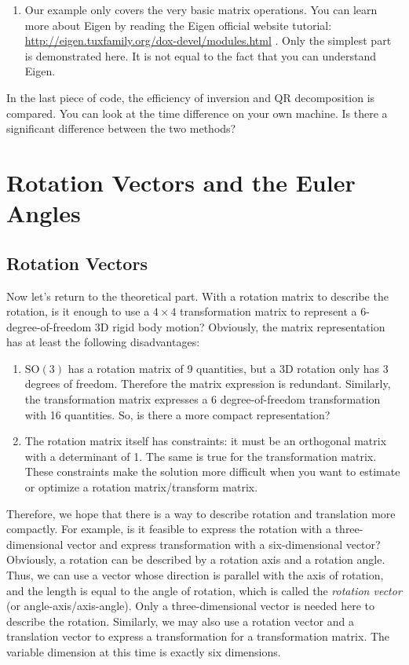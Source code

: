 \begin{enumerate}
    \item Our example only covers the very basic matrix operations. You can learn more about Eigen by reading the Eigen official website tutorial: \\ { \url{http://eigen.tuxfamily.org/dox-devel/modules.html} }. Only the simplest part is demonstrated here. It is not equal to the fact that you can understand Eigen.
\end{enumerate}

In the last piece of code, the efficiency of inversion and QR decomposition is compared. You can look at the time difference on your own machine. Is there a significant difference between the two methods?

\section{Rotation Vectors and the Euler Angles}
\subsection{Rotation Vectors}
Now let's return to the theoretical part. With a rotation matrix to describe the rotation, is it enough to use a $4 \times 4$ transformation matrix to represent a 6-degree-of-freedom 3D rigid body motion? Obviously, the matrix representation has at least the following disadvantages:
\begin{enumerate}
    \item  $\mathrm{SO}( 3 ) $ has a rotation matrix of 9 quantities, but a 3D rotation only has 3 degrees of freedom. Therefore the matrix expression is redundant. Similarly, the transformation matrix expresses a 6 degree-of-freedom transformation with 16 quantities. So, is there a more compact representation?
    \item The rotation matrix itself has constraints: it must be an orthogonal matrix with a determinant of 1. The same is true for the transformation matrix. These constraints make the solution more difficult when you want to estimate or optimize a rotation matrix/transform matrix.
\end{enumerate}

Therefore, we hope that there is a way to describe rotation and translation more compactly. For example, is it feasible to express the rotation with a three-dimensional vector and express transformation with a six-dimensional vector? Obviously, a rotation can be described by a rotation axis and a rotation angle. Thus, we can use a vector whose direction is parallel with the axis of rotation, and the length is equal to the angle of rotation, which is called the \textit{rotation vector} (or angle-axis/axis-angle). Only a three-dimensional vector is needed here to describe the rotation. Similarly, we may also use a rotation vector and a translation vector to express a transformation for a transformation matrix. The variable dimension at this time is exactly six dimensions.

